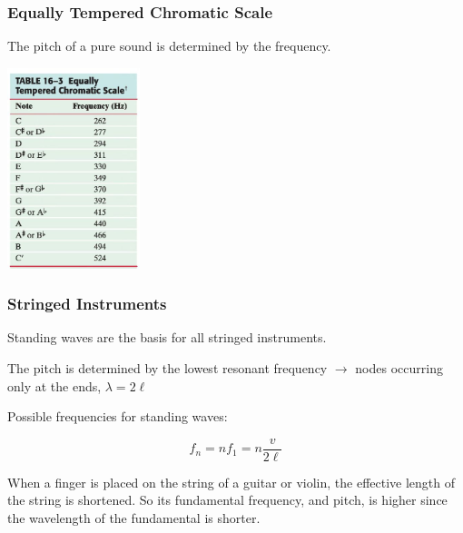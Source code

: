 \documentclass[]{beamer}
\begin{document}
\begin{frame}
\frametitle{Equally Tempered Chromatic Scale}

The pitch of a pure sound is determined by the frequency. 


  \begin{center}
  \includegraphics[height=2.3in]{images4/scale.jpg}
\end{center}



  \end{frame}






\begin{frame}
\frametitle{Stringed Instruments}

Standing waves are the basis for all stringed instruments.
\pause
\vspace{3mm}

The pitch is  determined by the lowest resonant frequency $\rightarrow$  nodes occurring only at the ends, $\lambda=2\ell$
\pause
\vspace{3mm}


Possible frequencies for standing waves:

\begin{equation}
f_n=nf_1=n\frac{v}{2\ell}
\end{equation}

\pause
\vspace{3mm}


When a finger is placed on the string of a guitar or violin, the effective length of
the string is shortened. So its fundamental frequency, and pitch, is higher since the
wavelength of the fundamental is shorter.




  \end{frame}
\end{document}
